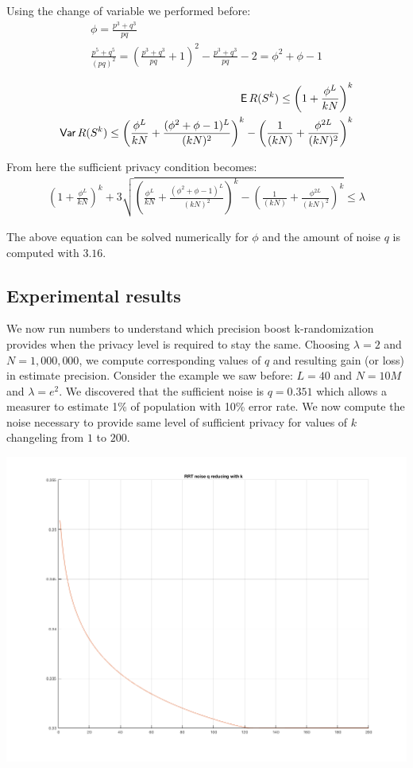 \documentclass[11pt]{article}
\begin{document}
Using the change of variable we performed before:
\begin{align*}
\phi = \frac{p^3 + q^3}{pq} \\
 \frac{p^5 + q^5}{(pq)^2} = \left (  \frac{p^3 + q^3}{pq}  + 1 \right )^2 -  \frac{p^3 + q^3}{pq} - 2 = \phi^2  + \phi - 1
\end{align*}


\begin{align*}
\operatorname{\mathsf{E}} R(S^k) \le \left ( 1 +  \frac{ \phi^L}{kN} \right )^k \\
\operatorname{\mathsf{Var}} R(S^k) \le  \left ( \frac{ \phi^L}{kN} +  \frac{( \phi^2 + \phi - 1)^L}{(kN)^2}\right )^k -  \left (  \frac{1}  {(kN)} +   \frac{\phi^{2L}} {(kN)^{2}}  \right )^k
\end{align*}

From here the sufficient privacy condition becomes:
\begin{align}
\left ( 1 +  \frac{ \phi^L}{kN} \right )^k  + 3 \sqrt{  \left ( \frac{ \phi^L}{kN} +  \frac{( \phi^2 + \phi - 1)^L}{(kN)^2}\right )^k -  \left (  \frac{1}  {(kN)} +   \frac{\phi^{2L}} {(kN)^{2}}  \right )^k } \le \lambda
\end{align}

The above equation can be solved numerically for $\phi$ and the amount of noise $q$ is computed with $3.16$.

\subsection{Experimental results}
We now run numbers to understand which precision boost k-randomization provides when the privacy level is required to stay the same.   Choosing $\lambda=2$ and $N=1,000,000$, we compute corresponding values of $q$ and resulting gain (or loss) in estimate precision.  Consider the example we saw before: $L=40$ and $N=10M$ and $\lambda = e^2$.   We discovered that the sufficient noise is $q=0.351$ which allows a measurer to estimate 1\% of population with 10\% error rate.  We now compute the noise necessary to provide same level of sufficient privacy for values of $k$ changeling from $1$ to $200$.

 \includegraphics[scale =  0.4]{q_vs_k.png}
\end{document}
